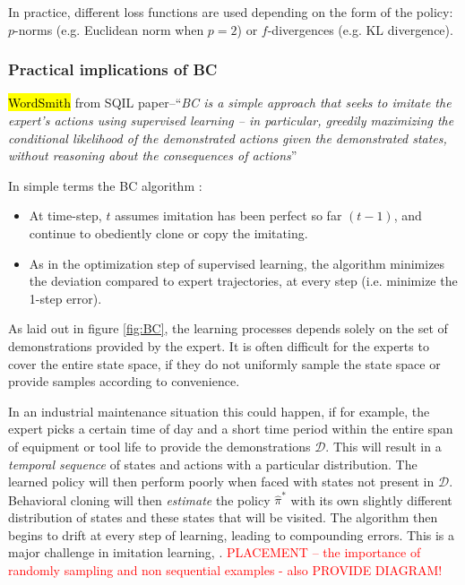 \documentclass{article}
\newcommand{\hlc}[2][blue!10]{{\colorlet{foo}{#1} \sethlcolor{foo}\hl{#2}}}
\begin{document}
In practice, different loss functions are used depending on the form of the policy: $p$-norms (e.g. Euclidean norm when $p=2$) or $f$-divergences (e.g. KL divergence).

\subsubsection{Practical implications of BC}
\hlc{WordSmith} from \cite{reddy2019sqil} SQIL paper--``\textit{BC is a simple approach that seeks to imitate the expert’s actions using supervised learning – in particular, greedily maximizing the conditional likelihood of the demonstrated actions given the demonstrated states, without reasoning about the consequences of actions}''

In simple terms the BC algorithm \citep{yue2018imitation}:
\begin{itemize}
\item At time-step, $t$ assumes imitation has been perfect so far $(t-1)$, and continue to obediently clone or copy the imitating.
\item As in the optimization step of supervised learning, the algorithm minimizes the deviation compared to expert trajectories, at every step (i.e. minimize the 1-step error).
\end{itemize}

As laid out in figure \ref{fig:BC}, the learning processes depends solely on the set of demonstrations provided by the expert. It is often difficult for the experts to cover the entire state space, if they do not uniformly sample the state space or provide samples according to convenience.

In an industrial maintenance situation this could happen, if for example, the expert picks a certain time of day and a short time period within the entire span of equipment or tool life to provide the demonstrations $\mathcal{D}$.  This will result in a \textit{temporal sequence} of states and actions with a particular distribution. The learned policy will then perform poorly when faced with states not present in $\mathcal{D}$. Behavioral cloning will then \textit{estimate} the policy ${\hat{\pi}}^*$ with its own slightly different distribution of states and these states  that will be visited. The algorithm then begins to drift at every step of learning, leading to compounding errors. This is a major challenge in imitation learning, \citep{yue2018imitation, stanford-lectures}. \textcolor{red}{PLACEMENT -- the importance of randomly sampling and non sequential examples - also PROVIDE DIAGRAM!} 
\end{document}
